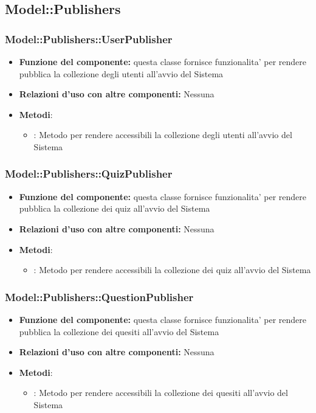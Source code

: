 \subsection{Model::Publishers}
\subsubsection{Model::Publishers::UserPublisher}
\begin{itemize}
\item\textbf{Funzione del componente:} questa classe fornisce funzionalita' per rendere pubblica la collezione degli utenti all'avvio del Sistema
\item\textbf{Relazioni d'uso con altre componenti:} Nessuna \\
\item\textbf{Metodi}:
	\begin{itemize}
		\item{} : Metodo per rendere accessibili la collezione degli utenti all'avvio del Sistema\\
	\end{itemize}
\end{itemize}

\subsubsection{Model::Publishers::QuizPublisher}
\begin{itemize}
\item\textbf{Funzione del componente:} questa classe fornisce funzionalita' per rendere pubblica la collezione dei quiz all'avvio del Sistema
\item\textbf{Relazioni d'uso con altre componenti:} Nessuna \\
\item\textbf{Metodi}:
	\begin{itemize}
		\item{} : Metodo per rendere accessibili la collezione dei quiz all'avvio del Sistema\\
	\end{itemize}
\end{itemize}

\subsubsection{Model::Publishers::QuestionPublisher}
\begin{itemize}
\item\textbf{Funzione del componente:} questa classe fornisce funzionalita' per rendere pubblica la collezione dei quesiti all'avvio del Sistema
\item\textbf{Relazioni d'uso con altre componenti:} Nessuna \\
\item\textbf{Metodi}:
	\begin{itemize}
		\item{} : Metodo per rendere accessibili la collezione dei quesiti all'avvio del Sistema\\
	\end{itemize}
\end{itemize}
